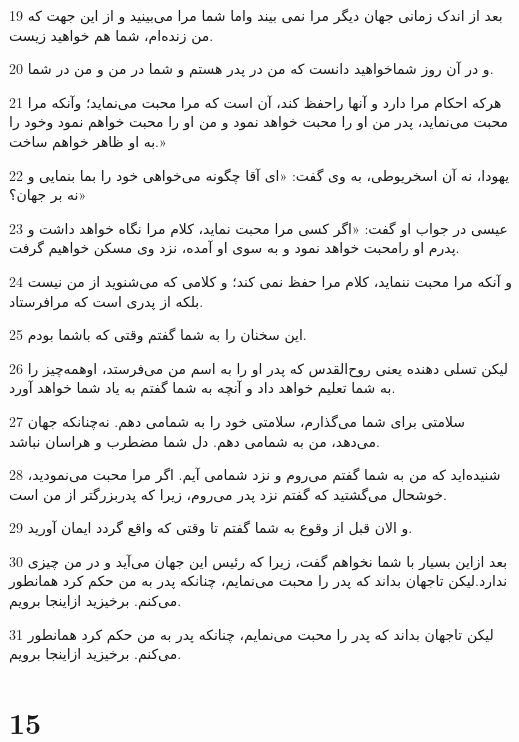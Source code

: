 \par 19 بعد از اندک زمانی جهان دیگر مرا نمی بیند واما شما مرا می‌بینید و از این جهت که من زنده‌ام، شما هم خواهید زیست.
\par 20 و در آن روز شماخواهید دانست که من در پدر هستم و شما در من و من در شما.
\par 21 هر‌که احکام مرا دارد و آنها راحفظ کند، آن است که مرا محبت می‌نماید؛ وآنکه مرا محبت می‌نماید، پدر من او را محبت خواهد نمود و من او را محبت خواهم نمود وخود را به او ظاهر خواهم ساخت.»
\par 22 یهودا، نه آن اسخریوطی، به وی گفت: «ای آقا چگونه می‌خواهی خود را بما بنمایی و نه بر جهان؟»
\par 23 عیسی در جواب او گفت: «اگر کسی مرا محبت نماید، کلام مرا نگاه خواهد داشت و پدرم او رامحبت خواهد نمود و به سوی او آمده، نزد وی مسکن خواهیم گرفت.
\par 24 و آنکه مرا محبت ننماید، کلام مرا حفظ نمی کند؛ و کلامی که می‌شنوید از من نیست بلکه از پدری است که مرافرستاد.
\par 25 این سخنان را به شما گفتم وقتی که باشما بودم.
\par 26 لیکن تسلی دهنده یعنی روح‌القدس که پدر او را به اسم من می‌فرستد، اوهمه‌چیز را به شما تعلیم خواهد داد و آنچه به شما گفتم به یاد شما خواهد آورد.
\par 27 سلامتی برای شما می‌گذارم، سلامتی خود را به شمامی دهم. نه‌چنانکه جهان می‌دهد، من به شمامی دهم. دل شما مضطرب و هراسان نباشد.
\par 28 شنیده‌اید که من به شما گفتم می‌روم و نزد شمامی آیم. اگر مرا محبت می‌نمودید، خوشحال می‌گشتید که گفتم نزد پدر می‌روم، زیرا که پدربزرگتر از من است.
\par 29 و الان قبل از وقوع به شما گفتم تا وقتی که واقع گردد ایمان آورید.
\par 30 بعد ازاین بسیار با شما نخواهم گفت، زیرا که رئیس این جهان می‌آید و در من چیزی ندارد.لیکن تاجهان بداند که پدر را محبت می‌نمایم، چنانکه پدر به من حکم کرد همانطور می‌کنم. برخیزید ازاینجا برویم.
\par 31 لیکن تاجهان بداند که پدر را محبت می‌نمایم، چنانکه پدر به من حکم کرد همانطور می‌کنم. برخیزید ازاینجا برویم.

\chapter{15}

